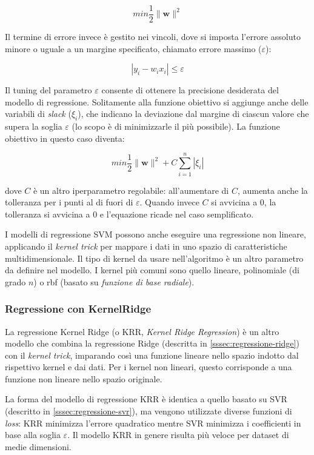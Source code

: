$$min \frac{1}{2}\|\mathbf{w}\|^{2}$$\smallskip

 Il termine di errore invece è gestito nei vincoli, dove si imposta l'errore assoluto minore o uguale a un margine specificato, chiamato errore massimo ($\varepsilon$):
 
 $$\left|y_{i}-w_{i} x_{i}\right| \leq \varepsilon$$\smallskip
 
 Il tuning del parametro $\varepsilon$ consente di ottenere la precisione desiderata del modello di regressione. Solitamente alla funzione obiettivo si aggiunge anche delle variabili di \textit{slack} ($\xi_{i}$), che indicano la deviazione dal margine di ciascun valore che supera la soglia $\varepsilon$ (lo scopo è di minimizzarle il più possibile). La funzione obiettivo in questo caso diventa:
 
 $$min \frac{1}{2}\|\mathbf{w}\|^{2} + C \sum_{i=1}^{n}\left|\xi_{i}\right|$$\smallskip

dove $C$ è un altro iperparametro regolabile: all'aumentare di $C$, aumenta anche la tolleranza per i punti al di fuori di $\varepsilon$. Quando invece $C$ si avvicina a 0, la tolleranza si avvicina a 0 e l'equazione ricade nel caso semplificato.

I modelli di regressione SVM possono anche eseguire una regressione non lineare, applicando il \textit{kernel trick} per mappare i dati in uno spazio di caratteristiche multidimensionale. Il tipo di kernel da usare nell'algoritmo è un altro parametro da definire nel modello. I kernel più comuni sono quello lineare, polinomiale (di grado $n$) o rbf (basato su \textit{funzione di base radiale}).

\subsubsection{Regressione con KernelRidge}\label{sssec:regressione-kridge}
La regressione Kernel Ridge (o KRR, \textit{Kernel Ridge Regression}) è un altro modello che combina la regressione Ridge (descritta in \ref{sssec:regressione-ridge}) con il \textit{kernel trick}, imparando così una funzione lineare nello spazio indotto dal rispettivo kernel e dai dati. Per i kernel non lineari, questo corrisponde a una funzione non lineare nello spazio originale. \cite{krr}

La forma del modello di regressione KRR è identica a quello basato su SVR (descritto in \ref{sssec:regressione-svr}), ma vengono utilizzate diverse funzioni di \textit{loss}: KRR minimizza l'errore quadratico mentre SVR minimizza i coefficienti in base alla soglia $\varepsilon$. Il modello KRR in genere risulta più veloce per dataset di medie dimensioni.

